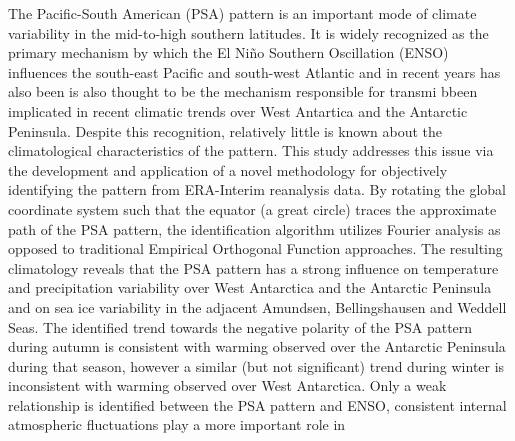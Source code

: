 The Pacific-South American (PSA) pattern is an important mode of climate variability in the mid-to-high southern latitudes. It is widely recognized as the primary mechanism by which the El Ni\~{n}o Southern Oscillation (ENSO) influences the south-east Pacific and south-west Atlantic and in recent years has also been  is also thought to be the mechanism responsible for transmi bbeen implicated in recent climatic trends over West Antartica and the Antarctic Peninsula. Despite this recognition, relatively little is known about the climatological characteristics of the pattern. This study addresses this issue via the development and application of a novel methodology for objectively identifying the pattern from ERA-Interim reanalysis data. By rotating the global coordinate system such that the equator (a great circle) traces the approximate path of the PSA pattern, the identification algorithm utilizes Fourier analysis as opposed to traditional Empirical Orthogonal Function approaches. The resulting climatology reveals that the PSA pattern has a strong influence on temperature and precipitation variability over West Antarctica and the Antarctic Peninsula and on sea ice variability in the adjacent Amundsen, Bellingshausen and Weddell Seas. The identified trend towards the negative polarity of the PSA pattern during autumn is consistent with warming observed over the Antarctic Peninsula during that season, however a similar (but not significant) trend during winter is inconsistent with warming observed over West Antarctica. Only a weak relationship is identified between the PSA pattern and ENSO, consistent internal atmospheric fluctuations play a more important role in 